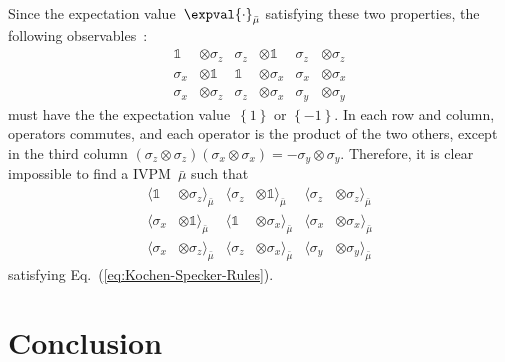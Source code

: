 \documentclass[english,reprint, aps, prl,superscriptaddress, showpacs,
showkeys, longbibliography, amsmath, amssymb]{revtex4-1}
\theoremstyle{plain}
\theoremstyle{definition}
\begin{document}
Since the expectation value~$\expval{\cdot}_{\bar{\mu}}$ satisfying
these two properties, the following observables~\cite{Mermin1990Simple,peres1995quantum}:
\begin{equation}
\begin{aligned}\mathbb{1} & \otimes\sigma_{z} & \sigma_{z} & \otimes\mathbb{1} & \sigma_{z} & \otimes\sigma_{z}\\
\sigma_{x} & \otimes\mathbb{1} & \mathbb{1} & \otimes\sigma_{x} & \sigma_{x} & \otimes\sigma_{x}\\
\sigma_{x} & \otimes\sigma_{z} & \sigma_{z} & \otimes\sigma_{x} & \sigma_{y} & \otimes\sigma_{y}
\end{aligned}
\label{eq:MerminSquare}
\end{equation}
must have the the expectation value~$\left\{ 1\right\} $ or $\left\{ -1\right\} $.
In each row and column, operators commutes, and each operator is the
product of the two others, except in the third column $\left(\sigma_{z}\otimes\sigma_{z}\right)\left(\sigma_{x}\otimes\sigma_{x}\right)=-\sigma_{y}\otimes\sigma_{y}$.
Therefore, it is clear impossible to find a IVPM~$\bar{\mu}$ such
that 
\begin{equation}
\begin{aligned}\langle\mathbb{1} & \otimes\sigma_{z}\rangle_{\bar{\mu}} & \langle\sigma_{z} & \otimes\mathbb{1}\rangle_{\bar{\mu}} & \langle\sigma_{z} & \otimes\sigma_{z}\rangle_{\bar{\mu}}\\
\langle\sigma_{x} & \otimes\mathbb{1}\rangle_{\bar{\mu}} & \langle\mathbb{1} & \otimes\sigma_{x}\rangle_{\bar{\mu}} & \langle\sigma_{x} & \otimes\sigma_{x}\rangle_{\bar{\mu}}\\
\langle\sigma_{x} & \otimes\sigma_{z}\rangle_{\bar{\mu}} & \langle\sigma_{z} & \otimes\sigma_{x}\rangle_{\bar{\mu}} & \langle\sigma_{y} & \otimes\sigma_{y}\rangle_{\bar{\mu}}
\end{aligned}
\label{eq:MerminSquare-values}
\end{equation}
satisfying Eq.~(\ref{eq:Kochen-Specker-Rules}).

\section{Conclusion}
\end{document}
